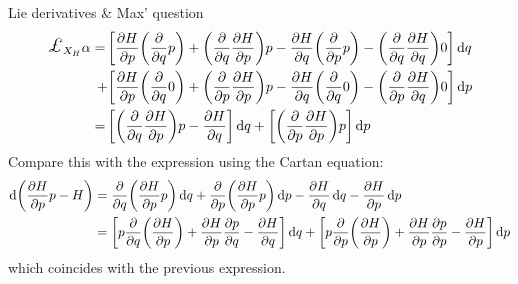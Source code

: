 \begin{mathbox}{Lie derivatives \& Max' question}
    \begin{equation*}
        \begin{split}
            \lied{X_H}{\alpha} =\, &\qty[\pdv{H}{p}\qty(\pdv{}{q}p) + \qty(\pdv{}{q}\pdv{H}{p})p - \pdv{H}{q}\qty(\pdv{}{p}p) - \qty(\pdv{}{q}\pdv{H}{q})0]\dd{q} \\
                                + &\qty[\pdv{H}{p}\qty(\pdv{}{q}0) + \qty(\pdv{}{p}\pdv{H}{p})p - \pdv{H}{q}\qty(\pdv{}{q} 0) - \qty(\pdv{}{p}\pdv{H}{q})0]\dd{p} \\
                               =\,&\qty[ \qty(\pdv{}{q}\pdv{H}{p})p - \pdv{H}{q}]\dd{q} + \qty[\qty(\pdv{}{p}\pdv{H}{p})p]\dd{p}\\
        \end{split}
    \end{equation*}
    Compare this with the expression using the Cartan equation:
    \begin{equation*}
        \begin{split}
            \dd{\qty(\pdv{H}{p}p - H)} &= \pdv{}{q}\qty(\pdv{H}{p}p)\dd{q} + \pdv{}{p}\qty(\pdv{H}{p}p)\dd{p} - \pdv{H}{q}\dd{q} - \pdv{H}{p}\dd{p}\\
                                       &= \qty[p\pdv{}{q}\qty(\pdv{H}{p}) + \pdv{H}{p}\pdv{p}{q} - \pdv{H}{q}]\dd{q} + \qty[p\pdv{}{p}\qty(\pdv{H}{p}) + \pdv{H}{p}\pdv{p}{p} - \pdv{H}{p}]\dd{p}
        \end{split}
    \end{equation*}
    which coincides with the previous expression.

\end{mathbox}

